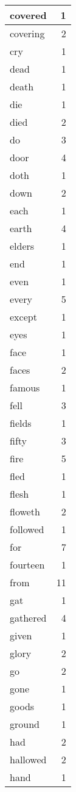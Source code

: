 \begin{center}
\begin{longtable}{l|r}
covered & 1 \\ \hline
covering & 2 \\ \hline
cry & 1 \\ \hline
dead & 1 \\ \hline
death & 1 \\ \hline
die & 1 \\ \hline
died & 2 \\ \hline
do & 3 \\ \hline
door & 4 \\ \hline
doth & 1 \\ \hline
down & 2 \\ \hline
each & 1 \\ \hline
earth & 4 \\ \hline
elders & 1 \\ \hline
end & 1 \\ \hline
even & 1 \\ \hline
every & 5 \\ \hline
except & 1 \\ \hline
eyes & 1 \\ \hline
face & 1 \\ \hline
faces & 2 \\ \hline
famous & 1 \\ \hline
fell & 3 \\ \hline
fields & 1 \\ \hline
fifty & 3 \\ \hline
fire & 5 \\ \hline
fled & 1 \\ \hline
flesh & 1 \\ \hline
floweth & 2 \\ \hline
followed & 1 \\ \hline
for & 7 \\ \hline
fourteen & 1 \\ \hline
from & 11 \\ \hline
gat & 1 \\ \hline
gathered & 4 \\ \hline
given & 1 \\ \hline
glory & 2 \\ \hline
go & 2 \\ \hline
gone & 1 \\ \hline
goods & 1 \\ \hline
ground & 1 \\ \hline
had & 2 \\ \hline
hallowed & 2 \\ \hline
hand & 1 \\ \hline

\end{longtable}
\end{center}
